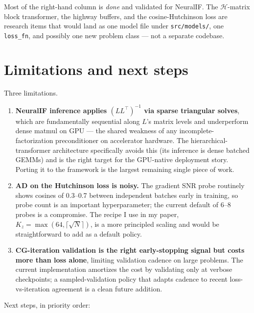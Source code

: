 \documentclass[11pt]{article}
\newcommand{\code}[1]{\texttt{\small #1}}
\begin{document}
Most of the right-hand column is \emph{done} and validated for NeuralIF. The $\mathcal H$-matrix block transformer, the highway buffers, and the cosine-Hutchinson loss are research items that would land as one model file under \code{src/models/}, one \code{loss\_fn}, and possibly one new problem class --- not a separate codebase.

\section{Limitations and next steps}

Three limitations.

\begin{enumerate}[leftmargin=*, itemsep=2pt, topsep=2pt]
\item \textbf{NeuralIF inference applies $(LL^\top)^{-1}$ via sparse triangular solves}, which are fundamentally sequential along $L$'s matrix levels and underperform dense matmul on GPU --- the shared weakness of any incomplete-factorization preconditioner on accelerator hardware. The hierarchical-transformer architecture specifically avoids this (its inference is dense batched GEMMs) and is the right target for the GPU-native deployment story. Porting it to the framework is the largest remaining single piece of work.
\item \textbf{AD on the Hutchinson loss is noisy.} The gradient SNR probe routinely shows cosines of 0.3--0.7 between independent batches early in training, so probe count is an important hyperparameter; the current default of 6--8 probes is a compromise. The recipe I use in my paper, $K_z = \max(64, \lceil\sqrt N\rceil)$, is a more principled scaling and would be straightforward to add as a default policy.
\item \textbf{CG-iteration validation is the right early-stopping signal but costs more than loss alone}, limiting validation cadence on large problems. The current implementation amortizes the cost by validating only at verbose checkpoints; a sampled-validation policy that adapts cadence to recent loss-vs-iteration agreement is a clean future addition.
\end{enumerate}

Next steps, in priority order:
\end{document}
